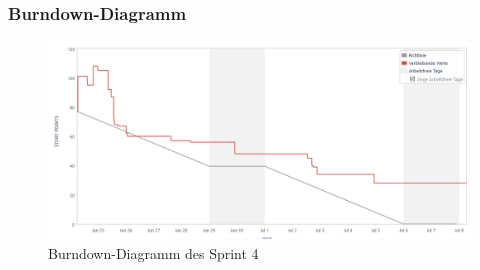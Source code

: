 \documentclass[12pt, titlepage]{scrartcl}
\begin{document}
			\subsubsection{Burndown-Diagramm}
		
			\begin{figure}[H] 
				\centering
				\includegraphics[width=1\textwidth]{BurndownChart_Sprint4.PNG}
				\caption{Burndown-Diagramm des Sprint 4}
				\label{BurndownSprint4}
			\end{figure}
\end{document}
